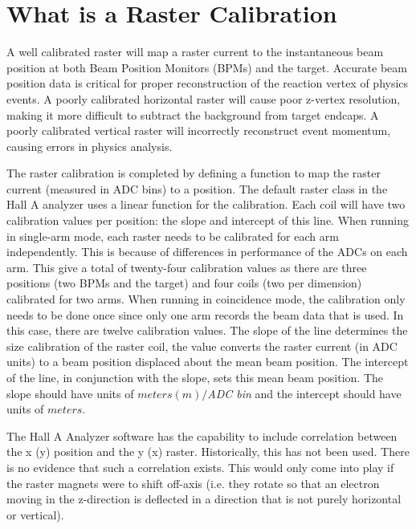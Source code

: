\label{app:raster_cal}
\section{What is a Raster Calibration} \label{what}

A well calibrated raster will map a raster current to the instantaneous beam position at both Beam Position Monitors (BPMs) and the target. Accurate beam position data is critical for proper reconstruction of the reaction vertex of physics events. A poorly calibrated horizontal raster will cause poor z-vertex resolution, making it more difficult to subtract the background from target endcaps. A poorly calibrated vertical raster will incorrectly reconstruct event momentum, causing errors in physics analysis.


The raster calibration is completed by defining a function to map the raster current (measured in ADC bins) to a position. The default raster class in the Hall A analyzer uses a linear function for the calibration. Each coil will have two calibration values per position: the slope and intercept of this line. When running in single-arm mode, each raster needs to be calibrated for each arm independently. This is because of differences in performance of the ADCs on each arm. This give a total of twenty-four calibration values as there are three positions (two BPMs and the target) and four coils (two per dimension) calibrated for two arms. When running in coincidence mode, the calibration only needs to be done once since only one arm records the beam data that is used. In this case, there are twelve calibration values. The slope of the line determines the size calibration of the raster coil, the value converts the raster current (in ADC units) to a beam position displaced about the mean beam position. The intercept of the line, in conjunction with the slope, sets this mean beam position. The slope should have units of $meters(m)/$\textit{ADC bin} and the intercept should have units of $meters$.

The Hall A Analyzer software has the capability to include correlation between the x (y) position and the y (x) raster. Historically, this has not been used. There is no evidence that such a correlation exists. This would only come into play if the raster magnets were to shift off-axis (i.e. they rotate so that an electron moving in the z-direction is deflected in a direction that is not purely horizontal or vertical).

